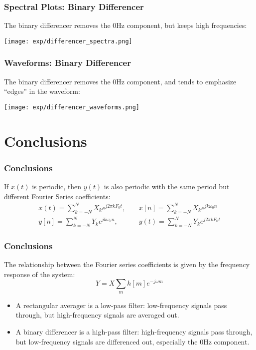 \documentclass{beamer}
\begin{document}
\begin{frame}
  \frametitle{Spectral Plots: Binary Differencer}

  The binary differencer removes the 0Hz component, but keeps high frequencies:
  \centerline{\texttt{[image: exp/differencer\_spectra.png]}}
\end{frame}

\begin{frame}
  \frametitle{Waveforms: Binary Differencer}

  The binary differencer removes the 0Hz component, and tends to
  emphasize ``edges'' in the waveform:
  \centerline{\texttt{[image: exp/differencer\_waveforms.png]}}
\end{frame}


\section{Conclusions}
\setcounter{subsection}{1}
\begin{frame}
  \frametitle{Conclusions}

  \begin{center}
  \end{center}
  If $x(t)$ is periodic, then $y(t)$ is also periodic with the same
  period but different Fourier Series coefficients:
  \begin{align*}
    x(t)=\sum_{k=-N}^{N}X_ke^{j2\pi kF_0t},~~~~~
    &x[n]=\sum_{k=-N}^{N}X_ke^{jk\omega_0n}\\
    y[n]=\sum_{k=-N}^{N}Y_ke^{jk\omega_0n},~~~~~
    &y(t)=\sum_{k=-N}^{N}Y_ke^{j2\pi kF_0t}
  \end{align*}  
\end{frame}

\begin{frame}
  \frametitle{Conclusions}

  The relationship between the Fourier series coefficients is given by
  the frequency response of the system:
  \begin{displaymath}
    Y = X \sum_m h[m]e^{-j\omega m}
  \end{displaymath}
  \begin{itemize}
  \item A rectangular averager is a low-pass filter: low-frequency
    signals pass through, but high-frequency signals are averaged out.
  \item A binary differencer is a high-pass filter: high-frequency
    signals pass through, but low-frequency signals are differenced
    out, especially the 0Hz component.
  \end{itemize}
\end{frame}
\end{document}
